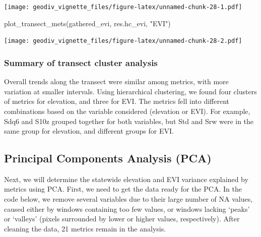 \documentclass[
]{article}
\newenvironment{Shaded}{\begin{snugshade}}{\end{snugshade}}
\newcommand{\FunctionTok}[1]{\textcolor[rgb]{0.00,0.00,0.00}{#1}}
\newcommand{\NormalTok}[1]{#1}
\newcommand{\StringTok}[1]{\textcolor[rgb]{0.31,0.60,0.02}{#1}}
\begin{document}
\texttt{[image: geodiv\_vignette\_files/figure-latex/unnamed-chunk-28-1.pdf]}

\begin{Shaded}
\begin{Highlighting}[]
\FunctionTok{plot\_transect\_mets}\NormalTok{(gathered\_evi, res.hc\_evi, }\StringTok{"EVI"}\NormalTok{)}
\end{Highlighting}
\end{Shaded}

\texttt{[image: geodiv\_vignette\_files/figure-latex/unnamed-chunk-28-2.pdf]}

\hypertarget{summary-of-transect-cluster-analysis}{%
\subsubsection{Summary of transect cluster
analysis}\label{summary-of-transect-cluster-analysis}}

Overall trends along the transect were similar among metrics, with more
variation at smaller intervals. Using hierarchical clustering, we found
four clusters of metrics for elevation, and three for EVI. The metrics
fell into different combinations based on the variable considered
(elevation or EVI). For example, Sdq6 and S10z grouped together for both
variables, but Std and Srw were in the same group for elevation, and
different groups for EVI.

\hypertarget{principal-components-analysis-pca}{%
\subsection{Principal Components Analysis
(PCA)}\label{principal-components-analysis-pca}}

Next, we will determine the statewide elevation and EVI variance
explained by metrics using PCA. First, we need to get the data ready for
the PCA. In the code below, we remove several variables due to their
large number of NA values, caused either by windows containing too few
values, or windows lacking `peaks' or `valleys' (pixels surrounded by
lower or higher values, respectively). After cleaning the data, 21
metrics remain in the analysis.
\end{document}
